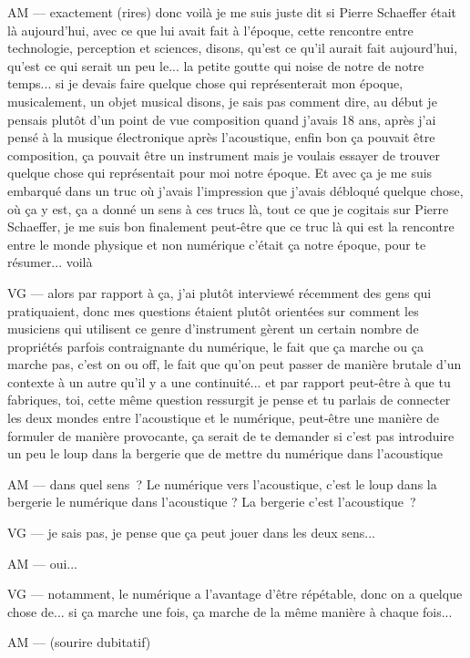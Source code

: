 AM — exactement (rires) donc voilà je me suis juste dit si Pierre Schaeffer était là aujourd'hui, avec ce que lui avait fait à l'époque, cette rencontre entre technologie, perception et sciences, disons, qu'est ce qu'il aurait fait aujourd'hui, qu'est ce qui serait un peu le... la petite goutte qui noise de notre de notre temps... si je devais faire quelque chose qui représenterait mon époque, musicalement, un objet musical disons, je sais pas comment dire, au début je pensais plutôt d'un point de vue composition quand j'avais 18 ans, après j'ai pensé à la musique électronique après l'acoustique, enfin bon ça pouvait être composition, ça pouvait être un instrument mais je voulais essayer de trouver quelque chose qui représentait pour moi notre époque. Et avec ça je me suis embarqué dans un truc où j'avais l'impression que j'avais débloqué quelque chose, où ça y est, ça a donné un sens à ces trucs là, tout ce que je cogitais sur Pierre Schaeffer, je me suis bon finalement peut-être que ce truc là qui est la rencontre entre le monde physique et non numérique c'était ça notre époque, pour te résumer... voilà

VG — alors par rapport à ça, j'ai plutôt interviewé récemment des gens qui pratiquaient, donc mes questions étaient plutôt orientées sur comment les musiciens qui utilisent ce genre d'instrument gèrent un certain nombre de propriétés parfois contraignante du numérique, le fait que ça marche ou ça marche pas, c'est on ou off, le fait que qu'on peut passer de manière brutale d'un contexte à un autre qu'il y a une continuité... et par rapport peut-être à que tu fabriques, toi, cette même question ressurgit je pense et tu parlais de connecter les deux mondes entre l'acoustique et le numérique, peut-être une manière de formuler de manière provocante, ça serait de te demander si c'est pas introduire un peu le loup dans la bergerie que de mettre du numérique dans l'acoustique 

AM — dans quel sens ? Le numérique vers l'acoustique, c'est le loup dans la bergerie le numérique dans l'acoustique ? La bergerie c'est l'acoustique ?

VG — je sais pas, je pense que ça peut jouer dans les deux sens... 

AM — oui... 

VG — notamment, le numérique a l'avantage d'être répétable, donc on a quelque chose de... si ça marche une fois, ça marche de la même manière à chaque fois... 

AM — (sourire dubitatif)

